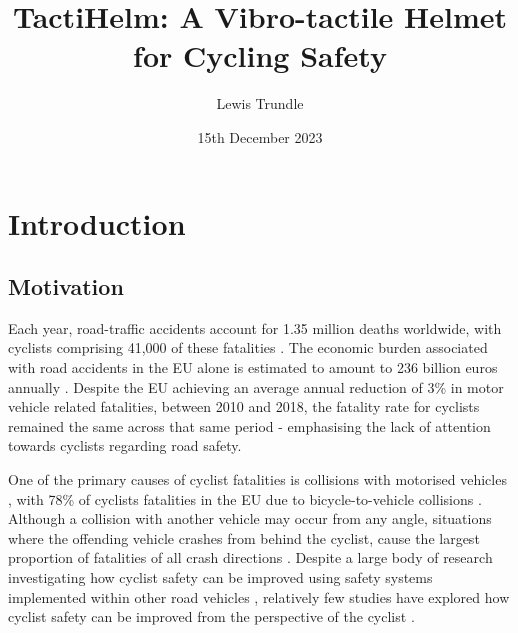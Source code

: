 \documentclass{interim}
\begin{document}
\title{TactiHelm: A Vibro-tactile Helmet for Cycling Safety}
\author{Lewis Trundle}
\date{15th December 2023}
\maketitle

\tableofcontents
\newpage

\section{Introduction}\label{intro}
\subsection{Motivation}
Each year, road-traffic accidents account for 1.35 million deaths worldwide, with cyclists comprising 41,000 of these fatalities \cite{world2018global}. The economic burden associated with road accidents in the EU alone is estimated to amount to 236 billion euros annually \cite{costoftransport}. Despite the EU achieving an average annual reduction of 3\% in motor vehicle related fatalities, between 2010 and 2018, the fatality rate for cyclists remained the same across that same period \cite{adminaite2020safe} - emphasising the lack of attention towards cyclists regarding road safety.

One of the primary causes of cyclist fatalities is collisions with motorised vehicles \cite{BIL20101632}, with 78\% of cyclists fatalities in the EU due to bicycle-to-vehicle collisions \cite{adminaite2015making}. Although a collision with another vehicle may occur from any angle, situations where the offending vehicle crashes from behind the cyclist, cause the largest proportion of fatalities of all crash directions \cite{BIL20101632}. Despite a large body of research investigating how cyclist safety can be improved using safety systems implemented within other road vehicles \cite{scholliers2014potential, SILLA2017134, cieslik2019improving, 7929602, 10.1145/3434770.3459732}, relatively few studies have explored how cyclist safety can be improved from the perspective of the cyclist \cite{10.1145/3490099.3511127, STROHAEKER2022151}. 
\end{document}
